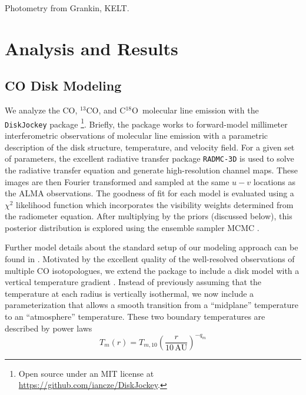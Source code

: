 \documentclass{aastex6}
\newcommand{\twelve}{CO}
\newcommand{\thirteen}{${}^{13}$CO}
\newcommand{\eighteen}{C${}^{18}$O}
\begin{document}
Photometry from Grankin, KELT.

\section{Analysis and Results}

\subsection{CO Disk Modeling}



We analyze the \twelve, \thirteen, and \eighteen\ molecular line emission with the \texttt{DiskJockey} package \citep{czekala15a}\footnote{Open source under an MIT license at \url{https://github.com/iancze/DiskJockey}.}. Briefly, the package works to forward-model millimeter interferometric observations of molecular line emission with a parametric description of the disk structure, temperature, and velocity field. For a given set of parameters, the excellent radiative transfer package \texttt{RADMC-3D} \citep{dullemond12} is used to solve the radiative transfer equation and generate high-resolution channel maps. These images are then Fourier transformed and sampled at the same $u-v$ locations as the ALMA observations. The goodness of fit for each model is evaluated using a $\chi^2$ likelihood function which incorporates the visibility weights determined from the radiometer equation. After multiplying by the priors (discussed below), this posterior distribution is explored using the ensemble sampler MCMC \citep{goodman10,foreman-mackey13}.

Further model details about the standard setup of our modeling approach can be found in \citep{czekala15a,czekala16}. Motivated by the excellent quality of the well-resolved observations of multiple CO isotopologues, we extend the package to include a disk model with a vertical temperature gradient \citep[e.g.,][]{dartois03}. Instead of previously assuming that the temperature at each radius is vertically isothermal, we now include a parameterization \citep[following][]{rosenfeld13a,williams14} that allows a smooth transition from a ``midplane'' temperature to an ``atmosphere'' temperature. These two boundary temperatures are described by power laws
\begin{equation}
	T_m(r) = T_{m,10} \left ( \frac{r}{10\,\textrm{AU}} \right )^{-q_m}
\end{equation}
\end{document}
